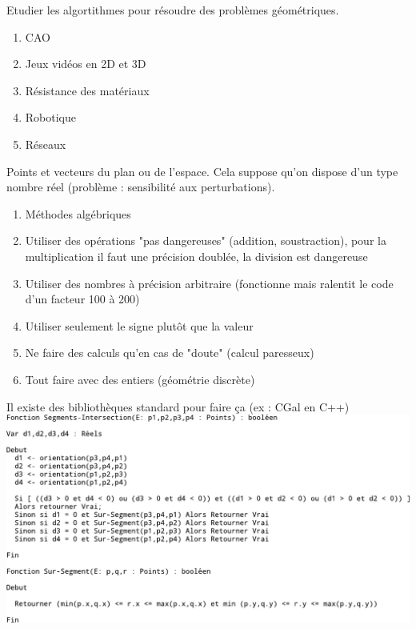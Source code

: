  Etudier les algortithmes pour résoudre des problèmes géométriques. \\

\begin{enumerate}
	\item CAO
	\item Jeux vidéos en 2D et 3D
	\item Résistance des matériaux
	\item Robotique
	\item Réseaux
\end{enumerate}

 Points et vecteurs du plan ou de l'espace. Cela suppose qu'on dispose d'un type nombre réel (problème : sensibilité aux perturbations). \\

\begin{enumerate}
	\item Méthodes algébriques
	\item Utiliser des opérations "pas dangereuses" (addition, soustraction), pour la multiplication il faut une précision doublée, la division est dangereuse
	\item Utiliser des nombres à précision arbitraire (fonctionne mais ralentit le code d'un facteur 100 à 200)
	\item Utiliser seulement le signe plutôt que la valeur
	\item Ne faire des calculs qu'en cas de "doute" (calcul paresseux)
	\item Tout faire avec des entiers (géométrie discrète)
\end{enumerate}
Il existe des bibliothèques standard pour faire ça (ex : CGal en C++)\\
\includegraphics{Images/fig7.pdf}

